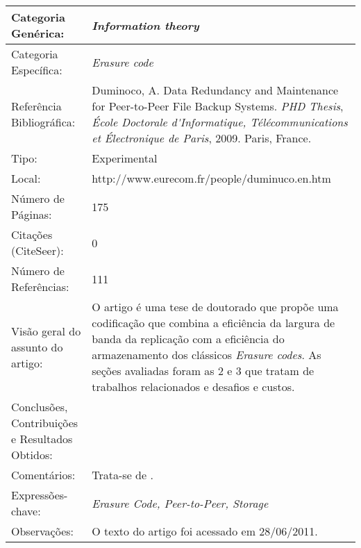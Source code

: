 \documentclass[10pt,a4paper]{article}
\begin{document}
\begin{center}
\begin{tabular}{|p{5cm}||p{10cm}|}
\hline

Categoria Genérica: & \emph{Information theory}\\\hline
Categoria Específica: & \emph{Erasure code}\\\hline
Referência Bibliográfica: & Duminoco, A. Data Redundancy and Maintenance for Peer-to-Peer File Backup Systems.  \emph{PHD Thesis}, \emph{\'{E}cole Doctorale d\'{}Informatique, T\'{e}l\'{e}communications et \'{E}lectronique de Paris}, 2009. Paris, France. \\\hline
Tipo: & Experimental\\\hline
Local: & http://www.eurecom.fr/people/duminuco.en.htm\\\hline
Número de Páginas: & 175\\\hline
Citações (CiteSeer): & 0\\\hline
Número de Referências: & 111\\\hline
Visão geral do assunto do artigo: & O artigo é uma tese de doutorado que propõe uma codificação que combina a eficiência da largura de banda da replicação com a eficiência do armazenamento dos clássicos \emph{Erasure codes}. As seções avaliadas foram as 2 e 3 que tratam de trabalhos relacionados e desafios e custos. \\\hline
Conclusões, Contribuições e Resultados Obtidos: & \\\hline
Comentários: & Trata-se de . \\\hline
Expressões-chave: & \emph{Erasure Code, Peer-to-Peer, Storage}\\\hline
Observações: &  O texto do artigo foi acessado em 28/06/2011.\\\hline

\end{tabular}
\end{center}
\end{document}
